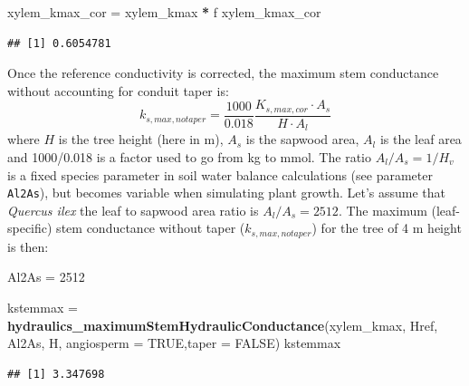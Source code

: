 \documentclass[]{book}
\newenvironment{Shaded}{\begin{snugshade}}{\end{snugshade}}
\newcommand{\KeywordTok}[1]{\textcolor[rgb]{0.13,0.29,0.53}{\textbf{#1}}}
\newcommand{\DataTypeTok}[1]{\textcolor[rgb]{0.13,0.29,0.53}{#1}}
\newcommand{\DecValTok}[1]{\textcolor[rgb]{0.00,0.00,0.81}{#1}}
\newcommand{\StringTok}[1]{\textcolor[rgb]{0.31,0.60,0.02}{#1}}
\newcommand{\OtherTok}[1]{\textcolor[rgb]{0.56,0.35,0.01}{#1}}
\newcommand{\OperatorTok}[1]{\textcolor[rgb]{0.81,0.36,0.00}{\textbf{#1}}}
\newcommand{\NormalTok}[1]{#1}
\begin{document}
\begin{Shaded}
\begin{Highlighting}[]
\NormalTok{xylem_kmax_cor =}\StringTok{ }\NormalTok{xylem_kmax }\OperatorTok{*}\StringTok{ }\NormalTok{f}
\NormalTok{xylem_kmax_cor}
\end{Highlighting}
\end{Shaded}

\begin{verbatim}
## [1] 0.6054781
\end{verbatim}

Once the reference conductivity is corrected, the maximum stem conductance without accounting for conduit taper is:
\begin{equation}
k_{s,max, notaper}=\frac{1000}{0.018} \frac{K_{s,max,cor}\cdot A_{s}}{H\cdot A_{l}}
\end{equation}
where \(H\) is the tree height (here in m), \(A_{s}\) is the sapwood area, \(A_{l}\) is the leaf area and 1000/0.018 is a factor used to go from kg to mmol. The ratio \(A_{l}/A_{s} = 1/H_v\) is a fixed species parameter in soil water balance calculations (see parameter \texttt{Al2As}), but becomes variable when simulating plant growth. Let's assume that \emph{Quercus ilex} the leaf to sapwood area ratio is \(A_{l}/A_{s} = 2512\). The maximum (leaf-specific) stem conductance without taper (\(k_{s, max, notaper}\)) for the tree of 4 m height is then:

\begin{Shaded}
\begin{Highlighting}[]
\NormalTok{Al2As =}\StringTok{ }\DecValTok{2512} 

\NormalTok{kstemmax =}\StringTok{ }\KeywordTok{hydraulics_maximumStemHydraulicConductance}\NormalTok{(xylem_kmax, }
\NormalTok{                  Href, Al2As, H, }\DataTypeTok{angiosperm =} \OtherTok{TRUE}\NormalTok{,}\DataTypeTok{taper =} \OtherTok{FALSE}\NormalTok{)}
\NormalTok{kstemmax}
\end{Highlighting}
\end{Shaded}

\begin{verbatim}
## [1] 3.347698
\end{verbatim}
\end{document}
